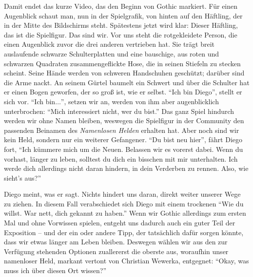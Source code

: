 \documentclass[a5paper,pagesize,numbers=noenddot]{scrbook}
\begin{document}
Damit endet das kurze Video, das den Beginn von Gothic markiert.
Für einen Augenblick schaut man, nun in der Spielgrafik, von hinten auf den Häftling, der in der Mitte des Bildschirms steht.
Spätestens jetzt wird klar:
Dieser Häftling, das ist die Spielfigur.
Das sind wir.
Vor uns steht die rotgekleidete Person, die einen Augenblick zuvor die drei anderen vertrieben hat.
Sie trägt breit auslaufende schwarze Schulterplatten und eine bauschige, aus roten und schwarzen Quadraten zusammengeflickte Hose, die in seinen Stiefeln zu stecken scheint.
Seine Hände werden von schweren Handschuhen geschützt; darüber sind die Arme nackt.
An seinem Gürtel baumelt ein Schwert und über die Schulter hat er einen Bogen geworfen, der so groß ist, wie er selbst.
\enquote{Ich bin Diego}, stellt er sich vor.
\enquote{Ich bin$\ldots$}, setzen wir an, werden von ihm aber augenblicklich unterbrochen:
\enquote{Mich interessiert nicht, wer du bist.}
Das ganz Spiel hindurch werden wir ohne Namen bleiben, weswegen die Spielfigur in der Community den passenden Beinamen des \textit{Namenlosen Helden} erhalten hat.
Aber noch sind wir kein Held, sondern nur ein weiterer Gefangener.
\enquote{Du bist neu hier}, fährt Diego fort, \enquote{Ich kümmere mich um die Neuen.
Belassen wir es vorerst dabei.
Wenn du vorhast, länger zu leben, solltest du dich ein bisschen mit mir unterhalten.
Ich werde dich allerdings nicht daran hindern, in dein Verderben zu rennen.
Also, wie sieht's aus?}

Diego meint, was er sagt.
Nichts hindert uns daran, direkt weiter unserer Wege zu ziehen.
In diesem Fall verabschiedet sich Diego mit einem trockenen \enquote{Wie du willst.
War nett, dich gekannt zu haben.}
Wenn wir Gothic allerdings zum ersten Mal und ohne Vorwissen spielen, entgeht uns dadurch auch ein guter Teil der Exposition -- und der ein oder andere Tipp, der tatsächlich dafür sorgen könnte, dass wir etwas länger am Leben bleiben.
Deswegen wählen wir aus den zur Verfügung stehenden Optionen zuallererst die oberste aus, woraufhin unser namenloser Held, markant vertont von Christian Wewerka, entgegnet:
\enquote{Okay, was muss ich über diesen Ort wissen?}
\end{document}
